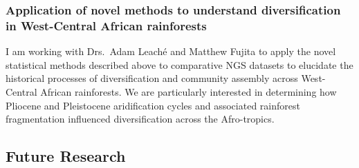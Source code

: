 \subsubsection*{Application of novel methods to understand diversification
in West-Central African rainforests}
I am working with Drs.\ Adam Leach\'{e} and Matthew Fujita to apply the novel
statistical methods described above to comparative NGS datasets
to elucidate the historical processes of diversification and community assembly
across West-Central African rainforests.
We are particularly interested in determining how Pliocene and Pleistocene
aridification cycles and associated rainforest fragmentation influenced
diversification across the Afro-tropics.


\subsection*{Future Research}


